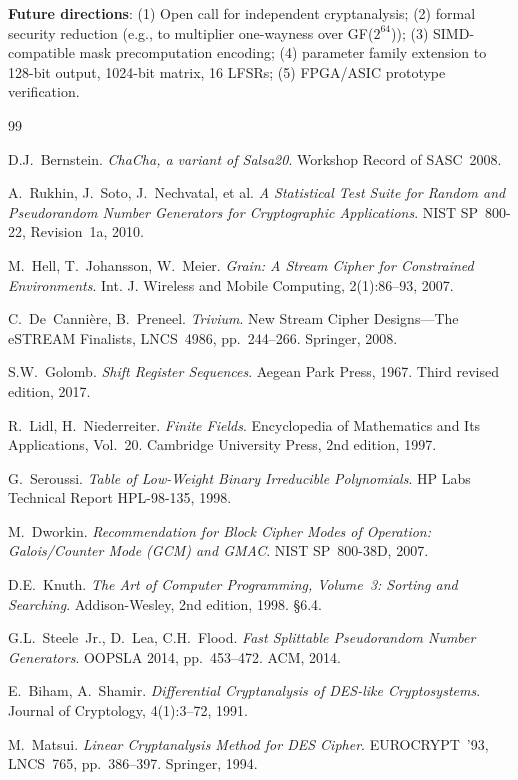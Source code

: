 \documentclass[11pt,a4paper]{article}
\begin{document}
\textbf{Future directions}: (1) Open call for independent cryptanalysis;
(2) formal security reduction (e.g., to multiplier one-wayness over
GF($2^{64}$)); (3) SIMD-compatible mask precomputation encoding; (4) parameter
family extension to 128-bit output, 1024-bit matrix, 16 LFSRs; (5) FPGA/ASIC
prototype verification.

\begin{thebibliography}{99}

D.J.~Bernstein. \emph{ChaCha, a variant of Salsa20}. Workshop Record of
SASC~2008.

A.~Rukhin, J.~Soto, J.~Nechvatal, et al. \emph{A Statistical Test Suite for
Random and Pseudorandom Number Generators for Cryptographic Applications}.
NIST SP~800-22, Revision~1a, 2010.

M.~Hell, T.~Johansson, W.~Meier. \emph{Grain: A Stream Cipher for Constrained
Environments}. Int. J. Wireless and Mobile Computing, 2(1):86--93, 2007.

C.~De~Canni\`ere, B.~Preneel. \emph{Trivium}. New Stream Cipher Designs---The
eSTREAM Finalists, LNCS~4986, pp.~244--266. Springer, 2008.

S.W.~Golomb. \emph{Shift Register Sequences}. Aegean Park Press, 1967. Third
revised edition, 2017.

R.~Lidl, H.~Niederreiter. \emph{Finite Fields}. Encyclopedia of Mathematics
and Its Applications, Vol.~20. Cambridge University Press, 2nd edition, 1997.

G.~Seroussi. \emph{Table of Low-Weight Binary Irreducible Polynomials}. HP Labs
Technical Report HPL-98-135, 1998.

M.~Dworkin. \emph{Recommendation for Block Cipher Modes of Operation:
Galois/Counter Mode (GCM) and GMAC}. NIST SP~800-38D, 2007.

D.E.~Knuth. \emph{The Art of Computer Programming, Volume~3: Sorting and
Searching}. Addison-Wesley, 2nd edition, 1998. \S6.4.

G.L.~Steele~Jr., D.~Lea, C.H.~Flood. \emph{Fast Splittable Pseudorandom Number
Generators}. OOPSLA 2014, pp.~453--472. ACM, 2014.

E.~Biham, A.~Shamir. \emph{Differential Cryptanalysis of DES-like
Cryptosystems}. Journal of Cryptology, 4(1):3--72, 1991.

M.~Matsui. \emph{Linear Cryptanalysis Method for DES Cipher}. EUROCRYPT~'93,
LNCS~765, pp.~386--397. Springer, 1994.


\end{thebibliography}
\end{document}
